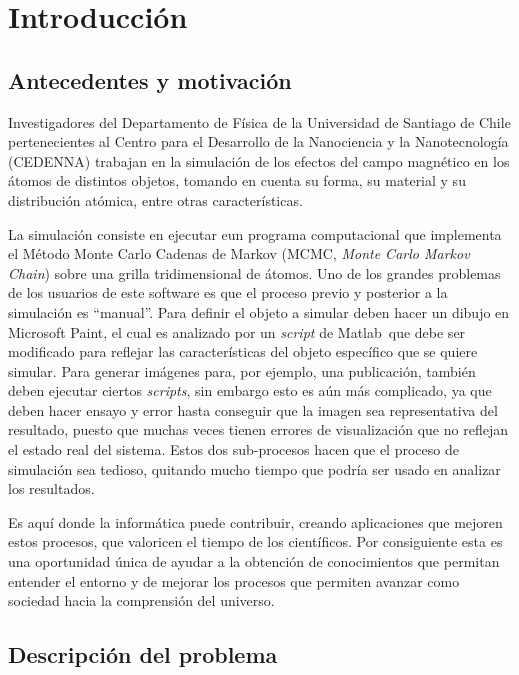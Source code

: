 \chapter{Introducci\'on}
\label{cap:intro}

\section{Antecedentes y motivaci\'on}
\label{intro:motivacion}

Investigadores del Departamento de Física de la Universidad de Santiago de Chile pertenecientes al Centro para el Desarrollo de la Nanociencia y la Nanotecnología (CEDENNA) trabajan en la simulación de los efectos del campo magnético en los átomos de distintos objetos, tomando en cuenta su forma, su material y su distribución atómica, entre otras características.

La simulación consiste en ejecutar eun programa computacional que implementa el Método Monte Carlo Cadenas de Markov (MCMC, \emph{Monte Carlo Markov Chain}) sobre una grilla tridimensional de átomos. Uno de los grandes problemas de los usuarios de este software es que el proceso previo y posterior a la simulación es ``manual''. Para definir el objeto a simular deben hacer un dibujo en Microsoft Paint\textregistered, el cual es analizado por un \emph{script} de Matlab\textregistered\ que debe ser modificado para reflejar las características del objeto específico que se quiere simular. Para generar imágenes para, por ejemplo, una publicación, también deben ejecutar ciertos \emph{scripts}, sin embargo esto es aún más complicado, ya que deben hacer ensayo y error hasta conseguir que la imagen sea representativa del resultado, puesto que muchas veces tienen errores de visualización que no reflejan el estado real del sistema. Estos dos sub-procesos hacen que el proceso de simulación sea tedioso, quitando mucho tiempo que podría ser usado en analizar los resultados.

Es aquí donde la informática puede contribuir, creando aplicaciones que mejoren estos procesos, que valoricen el tiempo de los científicos. Por consiguiente esta es una oportunidad única de ayudar a la obtención de conocimientos que permitan entender el entorno y de mejorar los procesos que permiten avanzar como sociedad hacia la comprensión del universo.


\section{Descripci\'on del problema}
\label{intro:problema}

